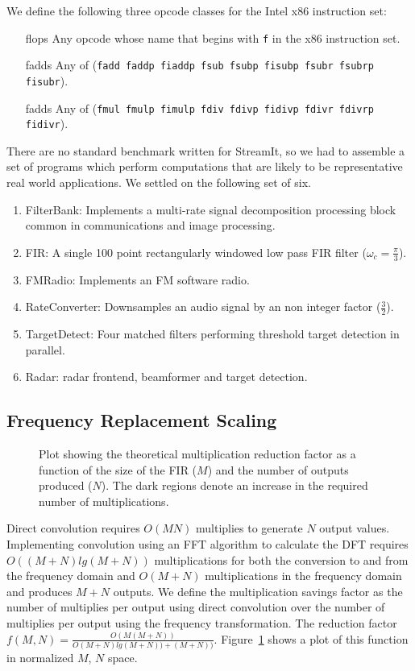 We define the following three opcode classes for the Intel x86 instruction set:
\begin{itemize}
\item[flops] Any opcode whose name that begins with {\tt f} in the x86 instruction set.
\item[fadds] Any of ({\tt fadd faddp fiaddp fsub fsubp fisubp fsubr fsubrp fisubr}).
\item[fadds] Any of ({\tt fmul fmulp fimulp fdiv fdivp fidivp fdivr fdivrp fidivr}).
\end{itemize}

There are no standard benchmark written for StreamIt, so we had to assemble
a set of programs which perform computations that are likely to be representative
real world applications. We settled on the following set of six.

\begin{enumerate}
\item FilterBank: Implements a multi-rate signal decomposition processing block common in communications and image processing.
\item FIR: A single 100 point rectangularly windowed low pass FIR filter ($\omega_c=\frac{\pi}{3}$).
\item FMRadio: Implements an FM software radio.
\item RateConverter: Downsamples an audio signal by an non integer factor ($\frac{3}{2}$).
\item TargetDetect: Four matched filters performing threshold target detection in parallel.
\item Radar: radar frontend, beamformer and target detection.
\end{enumerate}


\subsection{Frequency Replacement Scaling}

\begin{figure}
\center
\epsfxsize=3.2in
\caption{Plot showing the theoretical multiplication reduction factor as a function of the size of the FIR ($M$) and the number of outputs produced ($N$). The dark regions denote an increase in the required number of multiplications.}
\label{fig:frequency-win-theory}
\vspace{-12pt}
\end{figure}

Direct convolution requires $O(MN)$ multiplies to generate $N$ output values. 
Implementing convolution using an FFT algorithm to calculate the DFT requires 
$O((M+N)lg(M+N))$ multiplications for both the conversion to and from the frequency domain
and $O(M+N)$ multiplications in the frequency domain and produces $M+N$ outputs.
We define the multiplication savings factor as the number of multiplies per output
using direct convolution over the number of multiplies per output using the 
frequency transformation. The reduction factor 
$f(M,N)=\frac{O(M(M+N))}{O(M+N)lg(M+N))+(M+N))}$. 
Figure~\ref{fig:frequency-win-theory} shows a plot of this function in normalized 
$M$, $N$ space. 

